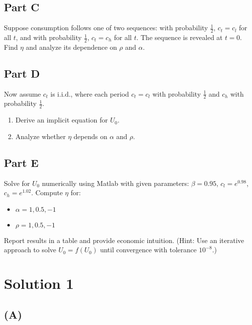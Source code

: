 \documentclass[10pt,a4paper]{article}
\begin{document}
  \subsection*{Part C}
    Suppose consumption follows one of two sequences: with probability $\frac{1}{2}$, $c_t = c_l$ for all $t$, and with probability $\frac{1}{2}$, $c_t = c_h$ for all $t$. The sequence is revealed at $t = 0$. Find $\eta$ and analyze its dependence on $\rho$ and $\alpha$.

  \subsection*{Part D}
    Now assume $c_t$ is i.i.d., where each period $c_t = c_l$ with probability $\frac{1}{2}$ and $c_h$ with probability $\frac{1}{2}$.
    \begin{enumerate}
        \item Derive an implicit equation for $U_0$.
        \item Analyze whether $\eta$ depends on $\alpha$ and $\rho$.
    \end{enumerate}

  \subsection*{Part E}
    Solve for $U_0$ numerically using Matlab with given parameters: $\beta = 0.95$, $c_l = e^{0.98}$, $c_h = e^{1.02}$. Compute $\eta$ for:
    \begin{itemize}
        \item $\alpha = 1, 0.5, -1$
        \item $\rho = 1, 0.5, -1$
    \end{itemize}
    Report results in a table and provide economic intuition.
    (Hint: Use an iterative approach to solve $U_0 = f(U_0)$ until convergence with tolerance $10^{-8}$.)
\section{Solution 1}
  \subsection*{(A)}
    
\end{document}
